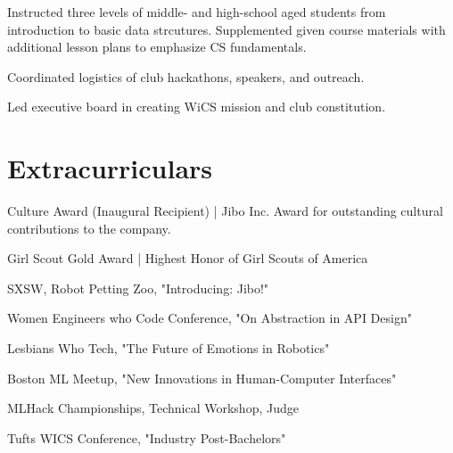 \documentclass[]{csaund_resume-openfont}
\begin{document}
Instructed three levels of middle- and high-school aged students from introduction to basic data strcutures. Supplemented given course materials with additional lesson plans to emphasize CS fundamentals.
\sectionsep

\begin{tightemize}
\item Coordinated logistics of club hackathons, speakers, and outreach.
\item Led executive board in creating WiCS mission and club constitution.
\end{tightemize}
\sectionsep


\section{Extracurriculars}
\descript{ }
\begin{tightemize}
\item Culture Award (Inaugural Recipient) | Jibo Inc. Award for outstanding cultural contributions to the company.
\item Girl Scout Gold Award | Highest Honor of Girl Scouts of America
\end{tightemize}
\sectionsep

\descript {}
\begin{tightemize}
\item SXSW, Robot Petting Zoo, "Introducing: Jibo!"
\item Women Engineers who Code Conference, "On Abstraction in API Design"
\item Lesbians Who Tech, "The Future of Emotions in Robotics"
\item Boston ML Meetup, "New Innovations in Human-Computer Interfaces"
\item MLHack Championships, Technical Workshop, Judge
\item Tufts WICS Conference, "Industry Post-Bachelors"
\end{tightemize}
\sectionsep
\end{document}
